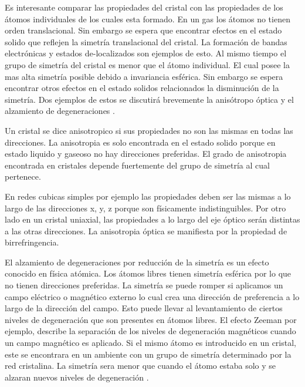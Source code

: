 \documentclass[a4paper,openright,12pt]{book}
\begin{document}
Es interesante comparar las propiedades del cristal con las propiedades de los átomos individuales de los cuales esta formado. En un gas los átomos no tienen orden translacional. Sin embargo se espera que encontrar efectos en el estado solido que reflejen la simetría translacional del cristal. La formación de bandas electrónicas y estados de-localizados son ejemplos de esto. Al mismo tiempo el grupo de simetría del cristal es menor que el átomo individual. El cual posee la mas alta simetría posible debido a invariancia esférica.
Sin embargo se espera encontrar otros efectos en el estado solidos relacionados la disminución de la simetría. Dos ejemplos de estos se discutirá brevemente la anisótropo óptica y el alzamiento de degeneraciones \cite{MarkFox}.

Un cristal se dice anisotropico si sus propiedades no son las mismas en todas las direcciones. La anisotropia es solo encontrada en el estado solido porque en estado liquido y gaseoso no hay direcciones preferidas. El grado de anisotropia encontrada en cristales depende fuertemente del grupo de simetría al cual pertenece.

En redes cubicas simples por ejemplo las propiedades deben ser las mismas a lo largo de las direcciones x, y, z porque son físicamente indistinguibles. Por otro lado en un cristal uniaxial, las propiedades a lo largo del eje óptico serán distintas a las otras direcciones. La anisotropia óptica se manifiesta por la propiedad de birrefringencia.

El alzamiento de degeneraciones por reducción de la simetría es un efecto conocido en física atómica. Los átomos libres tienen simetría esférica por lo que no tienen direcciones preferidas. La simetría se puede romper si aplicamos un campo eléctrico o magnético externo lo cual crea una dirección de preferencia a lo largo de la dirección del campo. Esto puede llevar al levantamiento de ciertos niveles de degeneración que son presentes en átomos libres. El efecto Zeeman por ejemplo, describe la separación de los niveles de degeneración magnéticos cuando un campo magnético es aplicado. Si el mismo átomo es introducido en un cristal, este se encontrara en un ambiente con un grupo de simetría determinado por la red cristalina. La simetría sera menor que cuando el átomo estaba solo y se alzaran nuevos niveles de degeneración \cite{MarkFox}.
\end{document}
